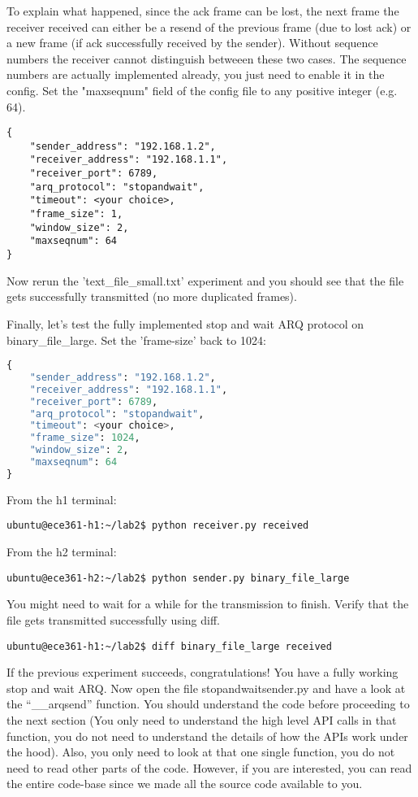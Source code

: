 \documentclass[11pt]{article}
\begin{document}
To explain what happened, since the ack frame can be lost, the next frame the receiver received can either be a resend of the previous frame (due to lost ack) or a new frame (if ack successfully received by the sender). Without sequence numbers the receiver cannot distinguish betweeen these two cases. The sequence numbers are actually implemented already, you just need to enable it in the config. Set the "maxseqnum" field of the config file to any positive integer (e.g. 64).

\begin{lstlisting}[caption={Configuration For Large File}]
{
    "sender_address": "192.168.1.2",
    "receiver_address": "192.168.1.1",
    "receiver_port": 6789,
    "arq_protocol": "stopandwait",
    "timeout": <your choice>,
    "frame_size": 1,
    "window_size": 2,
    "maxseqnum": 64
}
\end{lstlisting}

Now rerun the 'text\_file\_small.txt' experiment and you should see that the file gets successfully transmitted (no more duplicated frames).

Finally, let's test the fully implemented stop and wait ARQ protocol on binary\_file\_large. Set the 'frame-size' back to 1024:

\begin{lstlisting}[caption={Configuration For Large File}, language=python]
{
    "sender_address": "192.168.1.2",
    "receiver_address": "192.168.1.1",
    "receiver_port": 6789,
    "arq_protocol": "stopandwait",
    "timeout": <your choice>,
    "frame_size": 1024,
    "window_size": 2,
    "maxseqnum": 64
}
\end{lstlisting}
From the h1 terminal:
\begin{lstlisting}[style=ece361shell, caption={}]
ubuntu@ece361-h1:~/lab2$ python receiver.py received
\end{lstlisting}
From the h2 terminal:
\begin{lstlisting}[style=ece361shell, caption={}]
ubuntu@ece361-h2:~/lab2$ python sender.py binary_file_large
\end{lstlisting}

\noindent You might need to wait for a while for the transmission to finish. Verify that the file gets transmitted successfully using diff.
\begin{lstlisting}[style=ece361shell, caption={}]
ubuntu@ece361-h1:~/lab2$ diff binary_file_large received
\end{lstlisting}

\noindent If the previous experiment succeeds, congratulations! You have a fully working stop and wait ARQ. Now open the file stopandwaitsender.py and have a look at the ``\_\_arqsend'' function. You should understand the code before proceeding to the next section (You only need to understand the high level API calls in that function, you do not need to understand the details of how the APIs work under the hood). Also, you only need to look at that one single function, you do not need to read other parts of the code. However, if you are interested, you can read the entire code-base since we made all the source code available to you.
\end{document}
